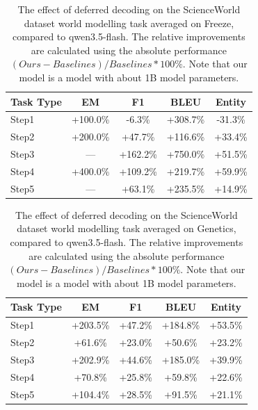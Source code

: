 \begin{table}[h]
\centering
    \setlength\tabcolsep{15pt}
    \setlength\extrarowheight{0pt}
\caption{The effect of deferred decoding on the ScienceWorld dataset \citep{wang-etal-2022-scienceworld} world modelling task averaged on Freeze, compared to qwen3.5-flash. The relative improvements are calculated using the absolute performance $(Ours - Baselines) / Baselines * 100\%$. Note that our model is a model with about 1B model parameters.}
\label{tab:scienceworld17}
\begin{tabular}{lcccc}
\toprule
\textbf{Task Type} & \textbf{EM} & \textbf{F1}
  & \textbf{BLEU} & \textbf{Entity}\\
\midrule
Step1 & +100.0\% & -6.3\% & +308.7\% & -31.3\% \\
Step2 & +200.0\% & +47.7\% & +116.6\% & +33.4\% \\
Step3 & — & +162.2\% & +750.0\% & +51.5\% \\
Step4 & +400.0\% & +109.2\% & +219.7\% & +59.9\% \\
Step5 & — & +63.1\% & +235.5\% & +14.9\% \\

\bottomrule
\end{tabular}
\end{table}



\begin{table}[h]
\centering
    \setlength\tabcolsep{15pt}
    \setlength\extrarowheight{0pt}
\caption{The effect of deferred decoding on the ScienceWorld dataset \citep{wang-etal-2022-scienceworld} world modelling task averaged on Genetics, compared to qwen3.5-flash. The relative improvements are calculated using the absolute performance $(Ours - Baselines) / Baselines * 100\%$. Note that our model is a model with about 1B model parameters.}
\label{tab:scienceworld18}
\begin{tabular}{lcccc}
\toprule
\textbf{Task Type} & \textbf{EM} & \textbf{F1}
  & \textbf{BLEU} & \textbf{Entity}\\
\midrule
Step1 & +203.5\% & +47.2\% & +184.8\% & +53.5\% \\
Step2 & +61.6\% & +23.0\% & +50.6\% & +23.2\% \\
Step3 & +202.9\% & +44.6\% & +185.0\% & +39.9\% \\
Step4 & +70.8\% & +25.8\% & +59.8\% & +22.6\% \\
Step5 & +104.4\% & +28.5\% & +91.5\% & +21.1\% \\

\bottomrule
\end{tabular}
\end{table}


